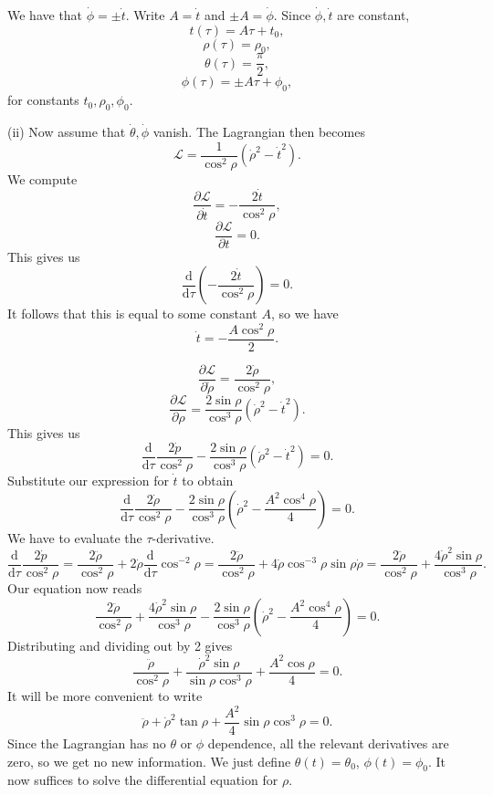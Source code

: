 \documentclass[11pt, letterpaper]{article}
\theoremstyle{plain}
\begin{document}
We have that $\dot{\phi } =\pm \dot{t} $. Write $A=\dot{t} $ and $\pm A = \dot{\phi } $. Since $\dot{\phi } ,\dot{t} $ are constant,
\[
	t(\tau )=A\tau +t_0,
\]
\[
	\rho (\tau )=\rho _0,
\]
\[
	\theta (\tau )=\frac{\pi }{2} 
,\]
\[
	\phi (\tau )=\pm A\tau +\phi _0,
\]
for constants $t_0,\rho _0,\phi _0$.

(ii) Now assume that $\dot{\theta } ,\dot{\phi } $ vanish. The Lagrangian then becomes
\[
	\mathcal{L} =\frac{1}{\cos ^2\rho } \left( \dot{\rho } ^2-\dot{t} ^2 \right) 
.\]
We compute
\[
	\frac{\partial \mathcal{L} }{\partial \dot{t} } =-\frac{2 \dot{t} }{\cos ^2\rho } ,
\]
\[
	\frac{\partial \mathcal{L} }{\partial t} =0
.\]
This gives us
\[
	\frac{\mathrm{d}}{\mathrm{d}\tau } \left( -\frac{2\dot{t} }{\cos ^2\rho }  \right) =0
.\]
It follows that this is equal to some constant $A$, so we have
\[
	\dot{t} =-\frac{A \cos ^2\rho }{2} 
.\]

\[
	\frac{\partial \mathcal{L} }{\partial \dot{\rho } } =\frac{2\dot{\rho } }{\cos ^2\rho } ,
\]
\[
	\frac{\partial \mathcal{L} }{\partial \rho } =\frac{2\sin \rho }{\cos ^3\rho } \left( \dot{\rho } ^2-\dot{t} ^2 \right) 
.\]
This gives us
\[
	\frac{\mathrm{d}}{\mathrm{d}\tau } \frac{2 \dot{p} }{\cos ^2\rho } -\frac{2 \sin \rho }{\cos ^3\rho } \left( \dot{\rho } ^2-\dot{t} ^2 \right) =0
.\]
Substitute our expression for $\dot{t} $ to obtain
\[
	\frac{\mathrm{d}}{\mathrm{d}\tau } \frac{2 \dot{\rho } }{\cos ^2\rho } -\frac{2 \sin \rho }{\cos ^3\rho } \left( \dot{\rho } ^2-\frac{A^2 \cos ^4\rho }{4}  \right) =0
.\]
We have to evaluate the $\tau $-derivative.
\[
	\frac{\mathrm{d}}{\mathrm{d}\tau } \frac{2\dot{p} }{\cos ^2\rho } =\frac{2\ddot{\rho }}{\cos ^2\rho } +2\dot{\rho }\frac{\mathrm{d}}{\mathrm{d}\tau } \cos ^{-2} \rho =\frac{2\ddot{\rho }}{\cos ^2\rho } +4 \dot{\rho } \cos ^{-3} \rho \sin \rho \dot{\rho } =\frac{2\ddot{\rho }}{\cos ^2\rho } +\frac{4\dot{\rho }^2 \sin \rho }{\cos ^3\rho } 
.\]
Our equation now reads
\[
	\frac{2\ddot{\rho }}{\cos ^2\rho } +\frac{4\dot{\rho } ^2 \sin \rho }{\cos ^3\rho } -\frac{2 \sin \rho }{\cos ^3\rho } \left( \dot{\rho } ^2-\frac{A^2 \cos ^4\rho }{4}  \right) =0
.\]
Distributing and dividing out by 2 gives
\[
\frac{\ddot{\rho } }{\cos ^2\rho } +\frac{\dot{\rho } ^2 \sin \rho }{\sin \rho \cos ^3\rho } +\frac{A^2 \cos \rho }{4} =0
.\]
It will be more convenient to write
\[
	\ddot{\rho }+\dot{\rho } ^2\tan \rho +\frac{A^2}{4} \sin \rho \cos ^3\rho =0
.\]
Since the Lagrangian has no $\theta $ or $\phi $ dependence, all the relevant derivatives are zero, so we get no new information. We just define $\theta (t)=\theta _0$, $\phi (t)=\phi _0$. It now suffices to solve the differential equation for $\rho $.
\end{document}
